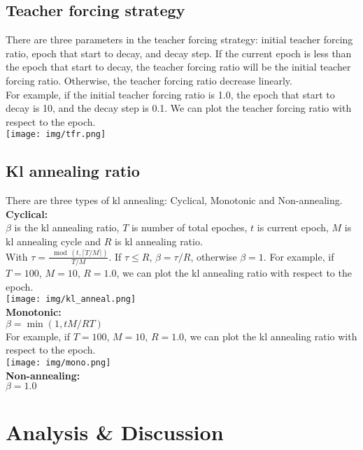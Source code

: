 \documentclass{article} %
\begin{document}
    \subsection{Teacher forcing strategy}
    There are three parameters in the teacher forcing strategy: initial teacher forcing ratio, epoch that start to decay, and decay step.
    If the current epoch is less than the epoch that start to decay, the teacher forcing ratio will be the initial teacher forcing ratio.
    Otherwise, the teacher forcing ratio decrease linearly.\\
    For example, if the initial teacher forcing ratio is 1.0, the epoch that start to decay is 10, and the decay step is 0.1.
    We can plot the teacher forcing ratio with respect to the epoch.\\
    \texttt{[image: img/tfr.png]}\\
    
    \subsection{Kl annealing ratio}
    There are three types of kl annealing: Cyclical, Monotonic and Non-annealing. \\
    \textbf{Cyclical:} \\
    $\beta$ is the kl annealing ratio, $T$ is number of total epoches, $t$ is current epoch, $M$ is kl annealing cycle and $R$ is kl annealing ratio.\\
    With $\tau = \frac{\mod(t, \lceil T/M \rceil)}{T/M}$. If $\tau \leq R$, $\beta = \tau / R$, otherwise $\beta = 1$.
    For example, if $T = 100$, $M = 10$, $R = 1.0$, we can plot the kl annealing ratio with respect to the epoch.\\
    \texttt{[image: img/kl\_anneal.png]}\\
    \textbf{Monotonic:} \\
    $\beta = \min(1, tM/RT)$\\
    For example, if $T = 100$, $M = 10$, $R = 1.0$, we can plot the kl annealing ratio with respect to the epoch.\\
    \texttt{[image: img/mono.png]}\\
    \textbf{Non-annealing:} \\
    $\beta = 1.0$\\
    

    \section{Analysis \& Discussion}
\end{document}
